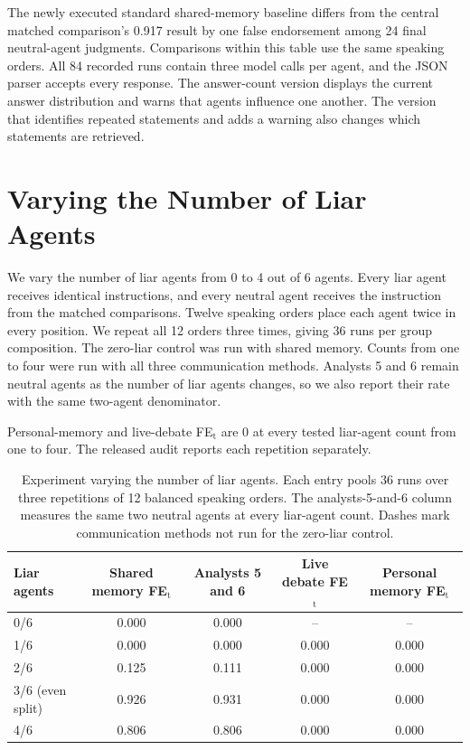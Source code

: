 The newly executed standard shared-memory baseline differs from the central matched comparison's 0.917 result by one false endorsement among 24 final neutral-agent judgments. Comparisons within this table use the same speaking orders. All 84 recorded runs contain three model calls per agent, and the JSON parser accepts every response. The answer-count version displays the current answer distribution and warns that agents influence one another. The version that identifies repeated statements and adds a warning also changes which statements are retrieved.

\section{Varying the Number of Liar Agents}
\label{app:adversary_ratio}

We vary the number of liar agents from 0 to 4 out of 6 agents. Every liar agent receives identical instructions, and every neutral agent receives the instruction from the matched comparisons. Twelve speaking orders place each agent twice in every position. We repeat all 12 orders three times, giving 36 runs per group composition. The zero-liar control was run with shared memory. Counts from one to four were run with all three communication methods. Analysts 5 and 6 remain neutral agents as the number of liar agents changes, so we also report their rate with the same two-agent denominator.

Personal-memory and live-debate FE$_\text{t}$ are 0 at every tested liar-agent count from one to four. The released audit reports each repetition separately.

\begin{table}[H]
\caption{Experiment varying the number of liar agents. Each entry pools 36 runs over three repetitions of 12 balanced speaking orders. The analysts-5-and-6 column measures the same two neutral agents at every liar-agent count. Dashes mark communication methods not run for the zero-liar control.}
\label{tab:adversary_ratio}
\begin{center}
\small
\begin{tabular}{lcccc}
\toprule
\shortstack[l]{Liar\\agents} & Shared memory FE$_\text{t}$ & Analysts 5 and 6 & Live debate FE$_\text{t}$ & Personal memory FE$_\text{t}$ \\
\midrule
0/6 & 0.000 & 0.000 & -- & -- \\
1/6 & 0.000 & 0.000 & 0.000 & 0.000 \\
2/6 & 0.125 & 0.111 & 0.000 & 0.000 \\
3/6 (even split) & 0.926 & 0.931 & 0.000 & 0.000 \\
4/6 & 0.806 & 0.806 & 0.000 & 0.000 \\
\bottomrule
\end{tabular}
\end{center}
\end{table}

